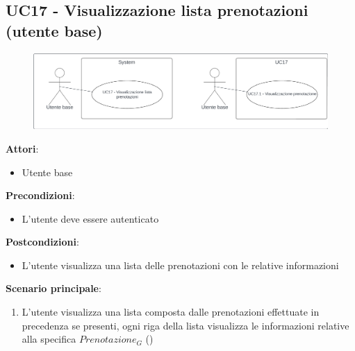\subsection{UC17 - Visualizzazione lista prenotazioni (utente base)} \label{usecase:17}
\begin{figure}[H]
  \centering
  \includegraphics[width=1\textwidth]{ucd/UCD17.png}
\end{figure}
\textbf{Attori}:
\begin{itemize}
    \item Utente base
\end{itemize}
\textbf{Precondizioni}:
\begin{itemize}
    \item L'utente deve essere autenticato
\end{itemize}
\textbf{Postcondizioni}:
\begin{itemize}
    \item L'utente visualizza una lista delle prenotazioni con le relative informazioni
\end{itemize}
\textbf{Scenario principale}:
\begin{enumerate}
    \item L'utente visualizza una lista composta dalle prenotazioni effettuate in precedenza se presenti, ogni riga della lista visualizza le informazioni relative alla specifica $\textit{Prenotazione}_G$ ()
\end{enumerate}

